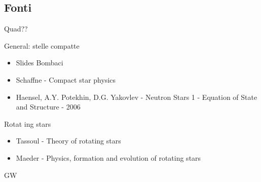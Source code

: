 \subsection{Fonti}

\begin{frame}{Quad??}
\end{frame}

\begin{frame}{General: stelle compatte} 
\begin{itemize}
    \item Slides Bombaci
    \item Schaffne - Compact star physics
    \item  Haensel, A.Y. Potekhin, D.G. Yakovlev - Neutron Stars 1 - Equation of State and Structure - 2006
\end{itemize}
\end{frame}

\begin{frame}{Rotat ing stars}
\begin{itemize}
\item Tassoul - Theory of rotating stars
\item Maeder - Physics, formation and evolution of rotating stars
\end{itemize}
\end{frame}

\begin{frame}{GW}
    
\end{frame}
